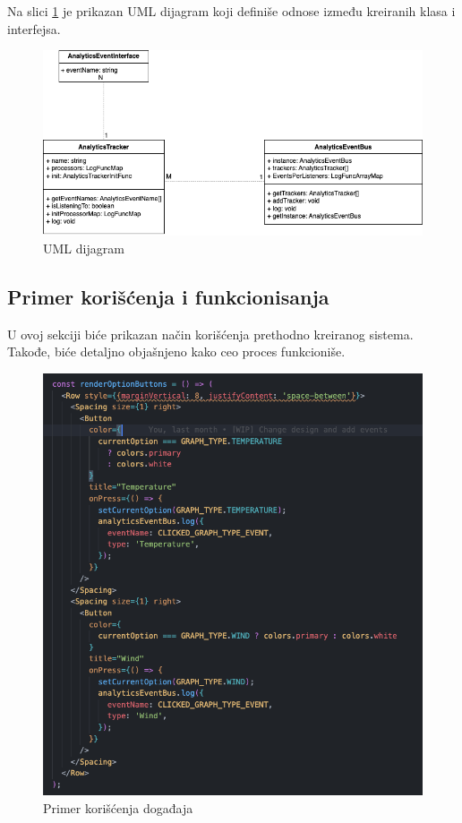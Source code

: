\documentclass[12pt,oneside]{memoir}
\begin{document}
Na slici \ref{fig:umlDiagram} je prikazan UML dijagram koji definiše odnose između kreiranih klasa i interfejsa.

\begin{figure}[h!]
\centering
\includegraphics[scale=0.5]{docs/images/chapterSix/uml.png}
\caption{UML dijagram}
\label{fig:umlDiagram}
\end{figure}

\subsection{Primer korišćenja i funkcionisanja}

U ovoj sekciji biće prikazan način korišćenja prethodno kreiranog sistema. Takođe, biće detaljno objašnjeno kako ceo proces funkcioniše.

\begin{figure}[h!]
\centering
\includegraphics[scale=0.30]{docs/images/chapterSix/eventUsage.png}
\caption{Primer korišćenja događaja}
\label{fig:eventUsage}
\end{figure}
\end{document}
